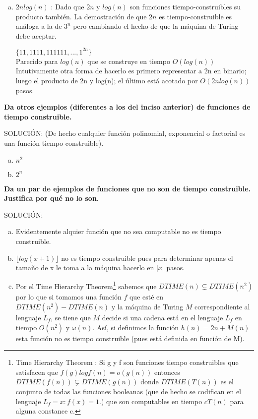 \documentclass[12pt,letterpaper]{article}
\begin{document}
\begin{enumerate}[a.]
 \item $2n log(n)$ : Dado que $2n$ y $log(n)$ son funciones tiempo-construibles su producto también. La demostración de que $2n$ es tiempo-construible es análoga a la de $3^{n}$ pero  cambiando el hecho de que la máquina de Turing debe aceptar. 

        $\{11, 1111, 111111, ..., 1^{2n}\}  $ \\

Parecido para $log(n)$ que se construye en tiempo $O(log(n))$\\

Intutivamente otra forma de hacerlo es primero representar a 2n  en binario; luego el producto de 2n y log(n); el último está acotado por $O(2n log(n))$ pasos.
    
    \end{enumerate}

\textbf{Da otros ejemplos (diferentes a los del inciso anterior) de funciones de tiempo construible.}

SOLUCIÓN: (De hecho cualquier función polinomial, exponencial o factorial es una función tiempo construible).

\begin{enumerate}[a.]
        \item $n^2$
    
        \item $2^n$
    \end{enumerate}
    
\textbf{Da un par de ejemplos de funciones que no son de tiempo construible. Justifica por qué no lo son.}

SOLUCIÓN:
\begin{enumerate}[a.]
        \item Evidentemente alquier función que no sea computable no es tiempo construible. 

        \item $\lfloor log (x+1) \rfloor$ no es tiempo construible pues  para determinar apenas el tamaño de x le toma a la máquina hacerlo en $|x|$ pasos.
        
        \item Por el Time Hierarchy Theorem\footnote{Time Hierarchy Theorem : Si g y f son funciones tiempo construibles que satisfacen que $f(g) log f(n) = o (g(n)) $ entonces $DTIME (f(n)) \subsetneq DTIME (g(n))$ donde $DTIME(T(n))$ es el conjunto de todas las funciones booleanas (que de hecho se codifican en el lenguaje $L_f = {x : f(x) = 1}.$) que son computables en tiempo $c T(n)$ para alguna constance c.} sabemos que $DTIME (n) \subsetneq DTIME (n^{2})$ por lo que si tomamos una función $f$ que esté en $DTIME (n^{2}) - DTIME (n)$ y la máquina de Turing $M$ correspondiente al lenguaje $L_f$, se tiene que $M$ decide si una cadena está en el lenguaje $L_f$ en tiempo $O(n^{2})$ y $\omega(n)$. Así, si definimos la función $h(n)=2n + M(n)$ esta función no es tiempo construible (pues está definida en función de M).
        
\end{enumerate}
\end{document}
